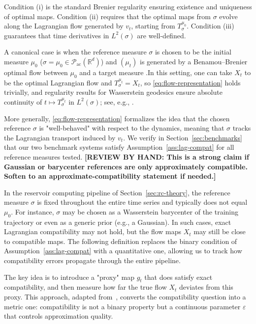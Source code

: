 \documentclass[11pt]{article}
\newcommand{\review}[1]{{\color{red}\textbf{[REVIEW BY HAND: #1]}}}
\newcommand{\R}{\mathbb{R}}
\newcommand{\1}{\mathbf{1}}
\begin{document}
Condition (i) is the standard Brenier regularity ensuring existence and uniqueness of optimal maps. Condition (ii) requires that the optimal maps from $\sigma$ evolve along the Lagrangian flow generated by $v_t$, starting from $T_\sigma^{\mu_0}$. Condition (iii) guarantees that time derivatives in $L^2(\sigma)$ are well-defined. \\

\begin{remark}\label{rem:lag-compat}
A canonical case is when the reference measure $\sigma$ is chosen to be the initial measure $\mu_0$ ($\sigma=\mu_0\in\mathcal{P}_{\mathrm{ac}}(\R^d)$) and $(\mu_t)$ is generated by a Benamou--Brenier optimal flow between $\mu_0$ and a target measure \cite{benamou2000computational,otto2001geometry,ambrosio2008gradient}.In this setting, one can take $X_t$ to be the optimal Lagrangian flow and $T_\sigma^{\mu_t}=X_t$, so \eqref{eq:flow-representation} holds trivially, and regularity results for Wasserstein geodesics ensure absolute continuity of $t\mapsto T_\sigma^{\mu_t}$ in $L^2(\sigma)$; see, e.g., \cite{ambrosio2008gradient,gigli-2011}.

More generally, \eqref{eq:flow-representation} formalizes the idea that the chosen reference $\sigma$ is "well-behaved" with respect to the dynamics, meaning that $\sigma$ tracks the Lagrangian transport induced by $v_t$. We verify in Section~\ref{sec:benchmarks} that our two benchmark systems 
satisfy Assumption~\ref{ass:lag-compat} for all reference measures tested.
\review{This is a strong claim if Gaussian or barycenter references are only approximately compatible. Soften to an approximate-compatibility statement if needed.}
\end{remark}

In the reservoir computing pipeline of Section~\ref{sec:rc-theory}, the reference measure $\sigma$ is fixed throughout the entire time series and typically does not equal $\mu_0$. For instance, $\sigma$ may be chosen as a Wasserstein barycenter of the training trajectory or even as a generic prior (e.g., a Gaussian). In such cases, exact Lagrangian compatibility may not
hold, but the flow maps $X_t$ may still be close to compatible maps. The following definition replaces the binary condition of Assumption~\ref{ass:lag-compat} with a quantitative one, allowing us to track how compatibility errors propagate through the entire pipeline. 

The key idea is to introduce a "proxy" map $g_t$ that does satisfy exact compatibility, and then measure how far the true flow $X_t$ deviates from this proxy.  This approach, adapted
from~\cite[Definition~2.2]{cloninger2023lotwassmap}, converts the compatibility question into a metric one: compatibility is not a binary property but a continuous parameter $\varepsilon$ that controls approximation quality. \\
\end{document}
